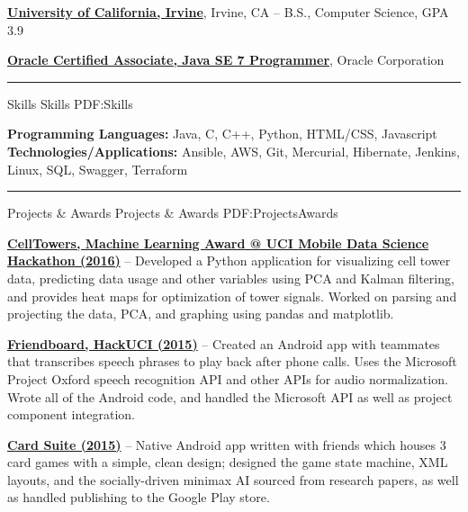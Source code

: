 \documentclass[letterpaper,MMMyyyy,nonstopmode]{simpleresumecv}
\begin{document}
\begin{Body}
\Entry
\href{https://uci.edu/}
{\textbf{University of California, Irvine}},
Irvine, CA
\hfill
{} --
\Gap
B.S., Computer Science, GPA 3.9\newline

\Entry
\href{http://education.oracle.com/pls/web_prod-plq-dad/db_pages.getpage?page_id=5001&get_params=p_exam_id:1Z0-803&p_org_id=&lang=}
{\textbf{Oracle Certified Associate, Java SE 7 Programmer}},
Oracle Corporation
\hfill
{}
\newline
\Gap

\hrule


\Section
{Skills}
{Skills}
{PDF:Skills}

\begin{flushleft}
\textbf{Programming Languages:} Java, C, C++, Python, HTML/CSS, Javascript
\textbf{Technologies/Applications:} Ansible, AWS, Git, Mercurial, Hibernate, Jenkins, Linux, SQL, Swagger, Terraform \newline
\end{flushleft}

\hrule


\Section
{Projects \& Awards}
{Projects \& Awards}
{PDF:ProjectsAwards}

\Entry
\BulletItem
\href{https://github.com/trizzle21/Datathon2016}
{\textbf{CellTowers, Machine Learning Award @ UCI Mobile Data Science Hackathon (2016)}} -- Developed a Python application for visualizing cell tower data, predicting data usage and other variables using PCA and Kalman filtering, and provides heat maps for optimization of tower signals. Worked on parsing and projecting the data, PCA, and graphing using pandas and matplotlib.\newline

\Entry
\BulletItem
\href{https://github.com/SVT125/HackUCI2015}
{\textbf{Friendboard, HackUCI (2015)}} -- Created an Android app with teammates that transcribes speech phrases to play back after phone calls. Uses the Microsoft Project Oxford speech recognition API and other APIs for audio normalization. Wrote all of the Android code, and handled the Microsoft API as well as project component integration.\newline

\Entry
\BulletItem
\href{https://github.com/SVT125/GermanBridge}
{\textbf{Card Suite (2015)}} -- Native Android app written with friends which houses 3 card games with a simple, clean design; designed the game state machine, XML layouts, and the socially-driven minimax AI sourced from research papers, as well as handled publishing to the Google Play store.\newline


\end{Body}
\end{document}
